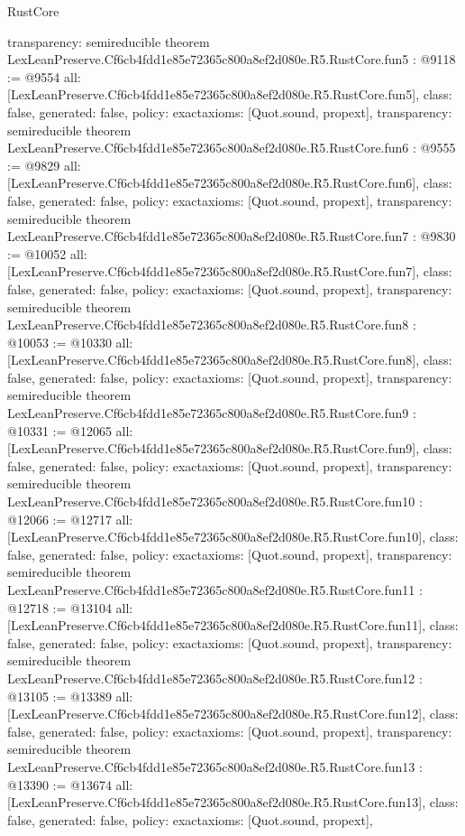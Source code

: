 \begin{lexlean}{RustCore}
\begin{coremodule}
{  transparency: semireducible
}
theorem LexLeanPreserve.Cf6cb4fdd1e85e72365c800a8ef2d080e.R5.RustCore.fun5 : @9118 := @9554 {
  all: [LexLeanPreserve.Cf6cb4fdd1e85e72365c800a8ef2d080e.R5.RustCore.fun5],
  class: false,
  generated: false,
  policy: exact{axioms: [Quot.sound, propext]},
  transparency: semireducible
}
theorem LexLeanPreserve.Cf6cb4fdd1e85e72365c800a8ef2d080e.R5.RustCore.fun6 : @9555 := @9829 {
  all: [LexLeanPreserve.Cf6cb4fdd1e85e72365c800a8ef2d080e.R5.RustCore.fun6],
  class: false,
  generated: false,
  policy: exact{axioms: [Quot.sound, propext]},
  transparency: semireducible
}
theorem LexLeanPreserve.Cf6cb4fdd1e85e72365c800a8ef2d080e.R5.RustCore.fun7 : @9830 := @10052 {
  all: [LexLeanPreserve.Cf6cb4fdd1e85e72365c800a8ef2d080e.R5.RustCore.fun7],
  class: false,
  generated: false,
  policy: exact{axioms: [Quot.sound, propext]},
  transparency: semireducible
}
theorem LexLeanPreserve.Cf6cb4fdd1e85e72365c800a8ef2d080e.R5.RustCore.fun8 : @10053 := @10330 {
  all: [LexLeanPreserve.Cf6cb4fdd1e85e72365c800a8ef2d080e.R5.RustCore.fun8],
  class: false,
  generated: false,
  policy: exact{axioms: [Quot.sound, propext]},
  transparency: semireducible
}
theorem LexLeanPreserve.Cf6cb4fdd1e85e72365c800a8ef2d080e.R5.RustCore.fun9 : @10331 := @12065 {
  all: [LexLeanPreserve.Cf6cb4fdd1e85e72365c800a8ef2d080e.R5.RustCore.fun9],
  class: false,
  generated: false,
  policy: exact{axioms: [Quot.sound, propext]},
  transparency: semireducible
}
theorem LexLeanPreserve.Cf6cb4fdd1e85e72365c800a8ef2d080e.R5.RustCore.fun10 : @12066 := @12717 {
  all: [LexLeanPreserve.Cf6cb4fdd1e85e72365c800a8ef2d080e.R5.RustCore.fun10],
  class: false,
  generated: false,
  policy: exact{axioms: [Quot.sound, propext]},
  transparency: semireducible
}
theorem LexLeanPreserve.Cf6cb4fdd1e85e72365c800a8ef2d080e.R5.RustCore.fun11 : @12718 := @13104 {
  all: [LexLeanPreserve.Cf6cb4fdd1e85e72365c800a8ef2d080e.R5.RustCore.fun11],
  class: false,
  generated: false,
  policy: exact{axioms: [Quot.sound, propext]},
  transparency: semireducible
}
theorem LexLeanPreserve.Cf6cb4fdd1e85e72365c800a8ef2d080e.R5.RustCore.fun12 : @13105 := @13389 {
  all: [LexLeanPreserve.Cf6cb4fdd1e85e72365c800a8ef2d080e.R5.RustCore.fun12],
  class: false,
  generated: false,
  policy: exact{axioms: [Quot.sound, propext]},
  transparency: semireducible
}
theorem LexLeanPreserve.Cf6cb4fdd1e85e72365c800a8ef2d080e.R5.RustCore.fun13 : @13390 := @13674 {
  all: [LexLeanPreserve.Cf6cb4fdd1e85e72365c800a8ef2d080e.R5.RustCore.fun13],
  class: false,
  generated: false,
  policy: exact{axioms: [Quot.sound, propext]},
}
\end{coremodule}
\end{lexlean}

